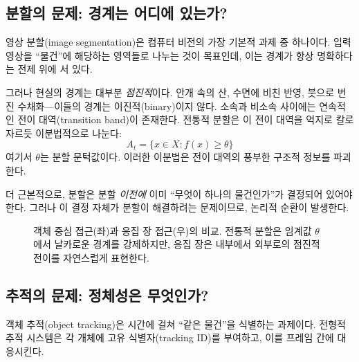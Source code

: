 \subsection{분할의 문제: 경계는 어디에 있는가?}
\label{subsec:segmentation-problem}

영상 분할(image segmentation)은 컴퓨터 비전의 가장 기본적 과제 중 하나이다. 입력 영상을 ``물건''에 해당하는 영역들로 나누는 것이 목표인데, 이는 경계가 항상 명확하다는 전제 위에 서 있다.

그러나 현실의 경계는 대부분 \emph{점진적}이다. 안개 속의 산, 수면에 비친 반영, 붓으로 번진 수채화---이들의 경계는 이진적(binary)이지 않다. 소속과 비소속 사이에는 연속적인 전이 대역(transition band)이 존재한다. 전통적 분할은 이 전이 대역을 억지로 칼로 자르듯 이분법적으로 나눈다:
\begin{equation}
    A_t = \{x \in X : f(x) \geq \theta\}
    \label{eq:crisp-threshold}
\end{equation}
여기서 $\theta$는 분할 문턱값이다. 이러한 이분법은 전이 대역의 풍부한 구조적 정보를 파괴한다.

더 근본적으로, 분할은 분할 \emph{이전에} 이미 ``무엇이 하나의 물건인가''가 결정되어 있어야 한다. 그러나 이 결정 자체가 분할이 해결하려는 문제이므로, 논리적 순환이 발생한다.

\begin{figure}[t]
\centering
\caption{객체 중심 접근(좌)과 응집 장 접근(우)의 비교. 전통적 분할은 임계값 $\theta$에서 날카로운 경계를 강제하지만, 응집 장은 내부에서 외부로의 점진적 전이를 자연스럽게 표현한다.}
\label{fig:crisp-vs-graded}
\end{figure}


\subsection{추적의 문제: 정체성은 무엇인가?}
\label{subsec:tracking-problem}

객체 추적(object tracking)은 시간에 걸쳐 ``같은 물건''을 식별하는 과제이다. 전형적 추적 시스템은 각 개체에 고유 식별자(tracking ID)를 부여하고, 이를 프레임 간에 대응시킨다.

